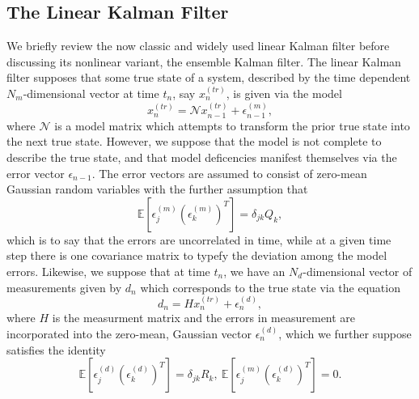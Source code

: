 \subsection*{The Linear Kalman Filter}
We briefly review the now classic and widely used linear Kalman filter before discussing its nonlinear variant, the ensemble Kalman filter.  The linear Kalman filter supposes that some true state of a system, described by the time dependent $N_{m}$-dimensional vector at time $t_{n}$, say $x^{(tr)}_{n}$, is given via the model 
\[
x^{(tr)}_{n} = \mathcal{N}x^{(tr)}_{n-1} + \epsilon^{(m)}_{n-1},
\]
where $\mathcal{N}$ is a model matrix which attempts to transform the prior true state into the next true state.  However, we suppose that the model is not complete to describe the true state, and that model deficencies manifest themselves via the error vector $\epsilon_{n-1}$.  The error vectors are assumed to consist of zero-mean Gaussian random variables with the further assumption that 
\[
\mathbb{E}\left[\epsilon_{j}^{(m)}\left(\epsilon_{k}^{(m)}\right)^{T}\right] = \delta_{jk} Q_{k},
\]
which is to say that the errors are uncorrelated in time, while at a given time step there is one covariance matrix to typefy the deviation among the model errors.  Likewise, we suppose that at time $t_{n}$, we have an $N_{d}$-dimensional vector of measurements given by $d_{n}$ which corresponds to the true state via the equation 
\[
d_{n} = Hx^{(tr)}_{n} + \epsilon^{(d)}_{n},
\]
where $H$ is the measurment matrix and the errors in measurement are incorporated into the zero-mean, Gaussian vector $\epsilon^{(d)}_{n}$, which we further suppose satisfies the identity
\[
\mathbb{E}\left[\epsilon^{(d)}_{j}\left(\epsilon_{k}^{(d)}\right)^{T}\right] = \delta_{jk} R_{k}, ~ \mathbb{E}\left[\epsilon_{j}^{(m)}\left(\epsilon_{k}^{(d)}\right)^{T}\right] = 0.
\]

